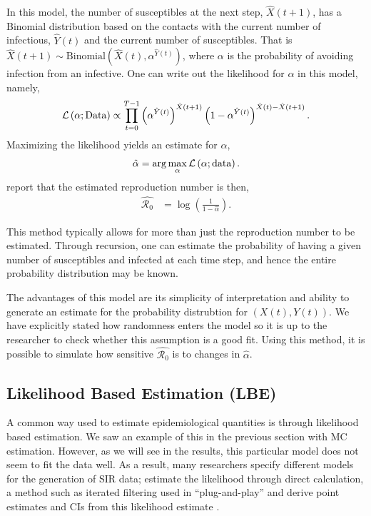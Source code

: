 \documentclass[12pt]{article}
\newcommand{\rr}{\ensuremath{\mathcal{R}_0}}
\begin{document}
In this model, the number of susceptibles at the next step, $\hat{X}(t+1)$, has a Binomial distribution based on the contacts with the current number of infectious, $\hat{Y}(t)$ and the current number of susceptibles.  That is $\hat{X}(t+1) \sim \text{Binomial}\left(\hat{X}(t), \alpha^{\hat{Y}(t)}\right)$, where $\alpha$ is the probability of avoiding infection from an infective.  One can write out the likelihood for $\alpha$ in this model, namely,
\begin{align*}
\mathcal{L}\left ( \alpha ; \textnormal{Data}\right ) \propto \prod_{t=0}^{T-1}\left ( \alpha^{\hat{Y}(t)} \right )^{\hat{X}(t+1)} \left (1- \alpha^{\hat{Y}(t)} \right )^{\hat{X}(t) - \hat{X}(t+1)}.
\end{align*}
Maximizing the likelihood yields an estimate for $\alpha$,
\begin{align*}
\hat{\alpha} = \arg \max_{\alpha} \mathcal{L}\left(\alpha; \textnormal{data} \right ).
  \end{align*}
 \cite{barbour2004} report that the estimated reproduction number is then,
\begin{align}\label{eq:r0-mc}
\hat{\rr} &= \log \left ( \frac{1}{1-\hat{\alpha}}\right ).
\end{align}

This method typically allows for more than just the reproduction number to be estimated.  Through recursion, one can estimate the probability of having a given number of susceptibles and infected at each time step, and hence the entire probability distribution may be known.

The advantages of this model are its simplicity of interpretation and ability to generate an estimate for the probability distrubtion for $(X(t), Y(t))$.  We have explicitly stated how randomness enters the model so it is up to the researcher to check whether this assumption is a good fit.  Using this method, it is possible to simulate how sensitive $\hat{\rr}$ is to changes in $\hat{\alpha}$.



\subsection{Likelihood Based Estimation (LBE)}\label{sec:likelihood-based}
A common way used to estimate epidemiological quantities is through likelihood based estimation.  We saw an example of this in the previous section with MC estimation.  However, as we will see in the results, this particular model does not seem to fit the data well.  As a result, many researchers specify different models for the generation of SIR data; estimate the likelihood through direct calculation, a method such as iterated filtering used in ``plug-and-play'' and derive point estimates and CIs from this likelihood estimate  \citep{abbey1952,forsberg2008,king2009,bhadra2012}.  
\end{document}
